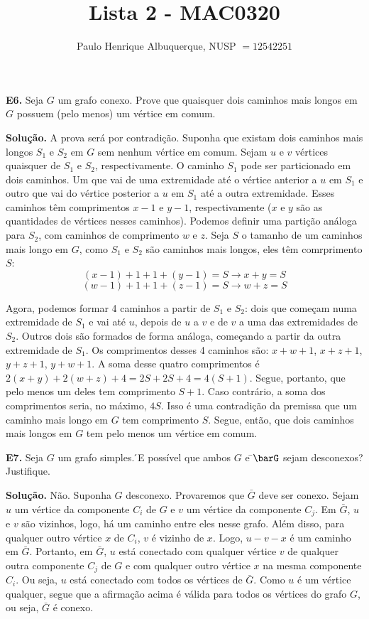 \documentclass{article}
\title{Lista 2 - MAC0320}
\author{Paulo Henrique Albuquerque, NUSP $=12542251$ }
\date{}
\begin{document}
\maketitle

\textbf{E6.} Seja $G$ um grafo conexo. Prove que quaisquer dois caminhos mais longos em $G$ possuem (pelo
menos) um vértice em comum.
\vspace{5mm}

\textbf{Solução.} A prova será por contradição. Suponha que existam dois caminhos mais longos $S_1$ e $S_2$ em $G$ sem nenhum vértice em comum. Sejam $u$ e $v$ vértices quaisquer de $S_1$ e $S_2$, respectivamente. O caminho $S_1$ pode ser particionado em dois caminhos. Um que vai de uma extremidade até o vértice anterior a $u$ em $S_1$ e outro que vai do vértice posterior a $u$ em $S_1$ até a outra extremidade. Esses caminhos têm comprimentos $x-1$ e $y-1$, respectivamente ($x$ e $y$ são as quantidades de vértices nesses caminhos). Podemos definir uma partição análoga para $S_2$, com caminhos de comprimento $w$ e $z$. Seja $S$ o tamanho de um caminhos mais longo em $G$, como $S_1$ e $S_2$ são caminhos mais longos, eles têm comrprimento $S$:
\[(x-1)+1+1+(y-1)=S\to x+y=S\]
\[(w-1)+1+1+(z-1)=S\to w+z=S\]

Agora, podemos formar 4 caminhos a partir de $S_1$ e $S_2$: dois que começam numa extremidade de $S_1$ e vai até $u$, depois de $u$ a $v$ e de $v$ a uma das extremidades de $S_2$. Outros dois são formados de forma análoga, começando a partir da outra extremidade de $S_1$. Os comprimentos desses 4 caminhos são: $x+w+1$, $x+z+1$, $y+z+1$, $y+w+1$. A soma desse quatro comprimentos é $2(x+y)+2(w+z)+4=2S+2S+4=4(S+1)$. Segue, portanto, que pelo menos um deles tem comprimento $S+1$. Caso contrário, a soma dos comprimentos seria, no máximo, $4S$. Isso é uma contradição da premissa que um caminho mais longo em $G$ tem comprimento $S$. Segue, então, que dois caminhos mais longos em $G$ tem pelo menos um vértice em comum.

\textbf{E7.} Seja $G$ um grafo simples.  ́E possível que ambos $G$ e  ̄$\barG$ sejam desconexos? Justifique.
\vspace{5mm}

\textbf{Solução.} Não. Suponha $G$ desconexo. Provaremos que $\bar{G}$ deve ser conexo. Sejam $u$ um vértice da componente $C_i$ de $G$ e $v$ um vértice da componente $C_j$. Em $\bar{G}$, $u$ e $v$ são vizinhos, logo, há um caminho entre eles nesse grafo. Além disso, para qualquer outro vértice $x$ de $C_i$, $v$ é vizinho de $x$. Logo, $u-v-x$ é um caminho em $\bar{G}$. Portanto, em $\bar{G}$, $u$ está conectado com qualquer vértice $v$ de qualquer outra componente $C_j$ de $G$ e com qualquer outro vértice $x$ na mesma componente $C_i$. Ou seja, $u$ está conectado com todos os vértices de $\bar{G}$. Como $u$ é um vértice qualquer, segue que a afirmação acima é válida para todos os vértices do grafo $G$, ou seja, $\bar{G}$ é conexo.
\end{document}
